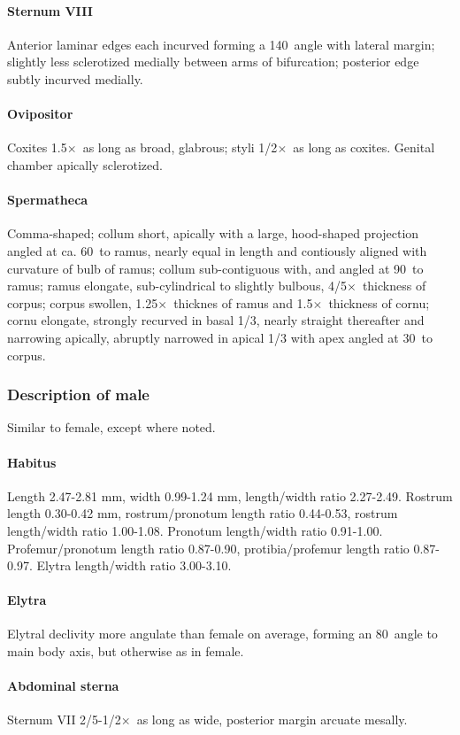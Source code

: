 \documentclass[fleqn,10pt,lineno]{wlpeerj} %
\newcommand{\td}{\textdegree~}
\newcommand{\x}{$\times$~}
\begin{document}
			\paragraph{Sternum VIII}
				Anterior laminar edges each incurved forming a 140\td angle with lateral margin; slightly less sclerotized medially between arms of bifurcation; posterior edge subtly incurved medially.
			\paragraph{Ovipositor}
				Coxites 1.5\x as long as broad, glabrous; styli 1/2\x as long as coxites. Genital chamber apically sclerotized.
			\paragraph{Spermatheca}
				Comma-shaped; collum short, apically with a large, hood-shaped projection angled at ca. 60\td to ramus, nearly equal in length and contiously aligned with curvature of bulb of ramus; collum sub-contiguous with, and angled at 90\td to ramus; ramus elongate, sub-cylindrical to slightly bulbous, 4/5\x thickness of corpus; corpus swollen, 1.25\x thicknes of ramus and 1.5\x thickness of cornu; cornu elongate, strongly recurved in basal 1/3, nearly straight thereafter and narrowing apically, abruptly narrowed in apical 1/3 with apex angled at 30\td to corpus.
		\subsubsection*{Description of male}
			Similar to female, except where noted.
			\paragraph{Habitus}
				Length 2.47-2.81 mm, width 0.99-1.24 mm, length/width ratio 2.27-2.49. Rostrum length 0.30-0.42 mm, rostrum/pronotum length ratio 0.44-0.53, rostrum length/width ratio 1.00-1.08. Pronotum length/width ratio 0.91-1.00. Profemur/pronotum length ratio 0.87-0.90, protibia/profemur length ratio 0.87-0.97. Elytra length/width ratio 3.00-3.10.
			\paragraph{Elytra}
				Elytral declivity more angulate than female on average, forming an 80\td angle to main body axis, but otherwise as in female.
			\paragraph{Abdominal sterna}
				Sternum VII 2/5-1/2\x as long as wide, posterior margin arcuate mesally.
\end{document}
